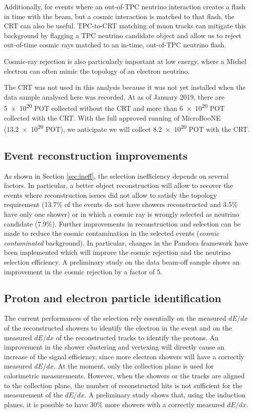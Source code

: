 Additionally, for events where an out-of-TPC neutrino interaction creates a flash in time with the beam, but a cosmic interaction is matched to that flash, the CRT can also be useful.  TPC-to-CRT matching of muon tracks can mitigate this background by flagging a TPC neutrino candidate object and allow us to reject out-of-time cosmic rays matched to an in-time, out-of-TPC neutrino flash.

Cosmic-ray rejection is also particularly important at low energy, where a Michel electron can often mimic the topology of an electron neutrino. 

The CRT was not used in this analysis because it was not yet installed when the data sample analysed here was recorded. At as of January 2019, there are \num{5e20} POT collected without the CRT and more than \num{6e20} POT collected with the CRT. With the full approved running of MicroBooNE (\num{13.2e20} POT), we anticipate we will collect \num{8.2e20} POT with the CRT.

\subsection*{Event reconstruction improvements}
As shown in Section \ref{sec:ineff}, the selection inefficiency depends on several factors. In particular, a better object reconstruction will allow to recover the events where reconstruction issues did not allow to satisfy the topology requirement (13.7\% of the events do not have showers reconstructed and 3.5\% have only one shower) or in which a cosmic ray is wrongly selected as neutrino candidate (7.9\%). 
Further improvements in reconstruction and selection can be made to reduce the cosmic contamination in the selected events (\emph{cosmic contaminated} background).
In particular, changes in the Pandora framework have been implemented which will improve the cosmic rejection and the neutrino selection efficiency. A preliminary study on the data beam-off sample shows an improvement in the cosmic rejection by a factor of 5.

\subsection*{Proton and electron particle identification}
The current performances of the selection rely essentially on the measured $dE/dx$ of the reconstructed showers to identify the electron in the event and on the measured $dE/dx$ of the reconstructed tracks to identify the protons. An improvement in the shower clustering and vertexing will directly cause an increase of the signal efficiency, since more electron showers will have a correctly measured $dE/dx$. 
At the moment, only the collection plane is used for calorimetric measurements. However, when the showers or the tracks are aligned to the collection plane, the number of reconstructed hits is not sufficient for the measurement of the $dE/dx$. A preliminary study shows that, using the induction planes, it is possible to have 30\% more showers with a correctly measured $dE/dx$.

